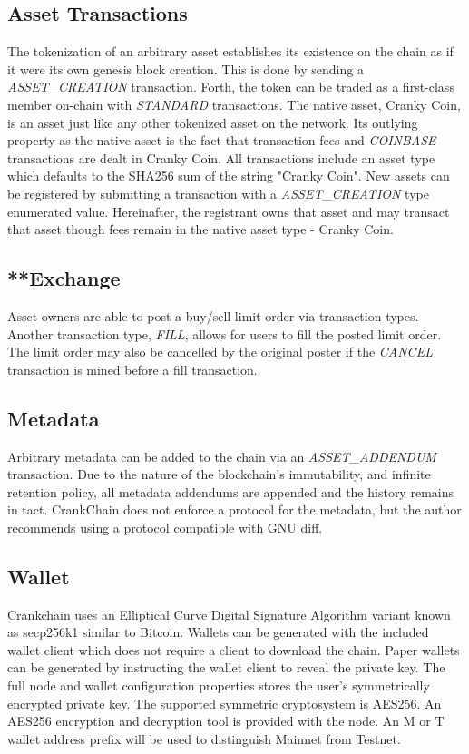 \documentclass[10pt,twocolumn]{article}
\begin{document}
\subsection{Asset Transactions}
The tokenization of an arbitrary asset establishes its existence on the chain as if it were its own genesis block creation.  This is done by sending a \textit{ASSET\_CREATION} transaction. Forth, the token can be traded as a first-class member on-chain with \textit{STANDARD} transactions.  The native asset, Cranky Coin, is an asset just like any other tokenized asset on the network.  Its outlying property as the native asset is the fact that transaction fees and \textit{COINBASE} transactions are dealt in Cranky Coin.
All transactions include an asset type which defaults to the SHA256 sum of the string "Cranky Coin".  New assets can be registered by submitting a transaction with a \textit{ASSET\_CREATION} type enumerated value.  Hereinafter, the registrant owns that asset and may transact that asset though fees remain in the native asset type - Cranky Coin.
\subsection{**Exchange}
Asset owners are able to post a buy/sell limit order via  transaction types.  Another transaction type, \textit{FILL}, allows for users to fill the posted limit order.  The limit order may also be cancelled by the original poster if the \textit{CANCEL} transaction is mined before a fill transaction.
\subsection{Metadata}
Arbitrary metadata can be added to the chain via an \textit{ASSET\_ADDENDUM}  transaction.
Due to the nature of the blockchain's immutability, and infinite retention policy, all metadata addendums are appended and the history remains in tact.  CrankChain does not enforce a protocol for the metadata, but the author recommends using a protocol compatible with GNU diff.
\subsection{Wallet}
Crankchain uses an Elliptical Curve Digital Signature Algorithm variant known as secp256k1 similar to Bitcoin. Wallets can be generated with the included wallet client which does not require a client to download the chain.  Paper wallets can be generated by instructing the wallet client to reveal the private key.  The full node and wallet configuration properties stores the user's symmetrically encrypted private key.  The supported symmetric cryptosystem is AES256.  An AES256 encryption and decryption tool is provided with the node.  An M or T wallet address prefix will be used to distinguish Mainnet from Testnet.
\end{document}
